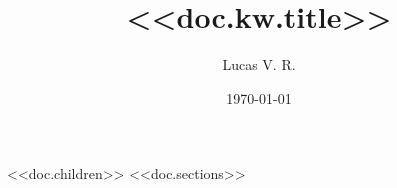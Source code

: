 \documentclass[11pt]{article}
\author{Lucas V. R.}
\date{\today}
\title{<<doc.kw.title>>}
\begin{document}
<<doc.children>>
<<doc.sections>>
\end{document}
